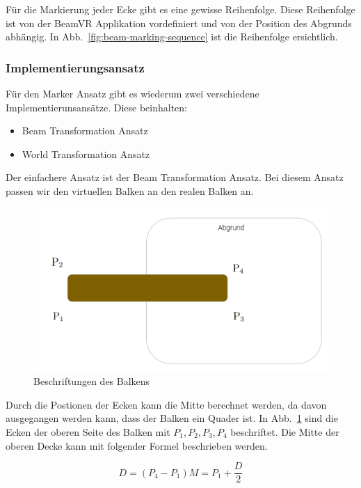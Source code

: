 Für die Markierung jeder Ecke gibt es eine gewisse Reihenfolge.
Diese Reihenfolge ist von der BeamVR Applikation vordefiniert und von der Position des Abgrunds abhängig.
In Abb.~\ref{fig:beam-marking-sequence} ist die Reihenfolge ersichtlich.

\subsubsection{Implementierungsansatz}

Für den Marker Ansatz gibt es wiederum zwei verschiedene Implementierunsansätze.
Diese beinhalten:

\begin{itemize}
    \item Beam Transformation Ansatz
    \item World Transformation Ansatz
\end{itemize}

Der einfachere Ansatz ist der Beam Transformation Ansatz.
Bei diesem Ansatz passen wir den virtuellen Balken an den realen Balken an.

\begin{figure}
    \centering
    \includegraphics[scale=0.25]{pics/beam-point-labeling}
    \caption{Beschriftungen des Balkens}
    \label{fig:beam-point-labeling}
\end{figure}


Durch die Postionen der Ecken kann die Mitte berechnet werden, da davon ausgegangen werden kann, dass der Balken ein Quader ist.
In Abb.~\ref{fig:beam-point-labeling} sind die Ecken der oberen Seite des Balken mit $P_{1}, P_{2}, P_{3}, P_{4}$ beschriftet.
Die Mitte der oberen Decke kann mit folgender Formel beschrieben werden.

\[

D = (P_{4} - P_{1})

M = P_{1} +  \frac{D}{2}

\]


